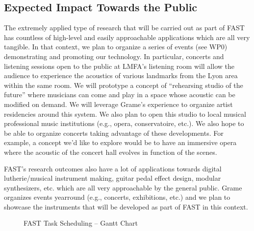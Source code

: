 \documentclass[a4paper,9pt]{extarticle}
\newcommand{\PP}{FAST}
\begin{document}
\subsection{Expected Impact Towards the Public}

The extremely applied type of research that will be carried out as part of \PP{} has countless of high-level and easily approachable applications which are all very tangible. In that context, we plan to organize a series of events (see WP0) demonstrating and promoting our technology. In particular, concerts and listening sessions open to the public at LMFA's listening room will allow the audience to experience the acoustics of various landmarks from the Lyon area within the same room. We will prototype a concept of ``rehearsing studio of the future'' where musicians can come and play in a space whose acoustic can be modified on demand. We will leverage Grame's experience to organize artist residencies around this system. We also plan to open this studio to local musical professional music institutions (e.g., opera, conservatoire, etc.). We also hope to be able to organize concerts taking advantage of these developments. For example, a concept we'd like to explore would be to have an immersive opera where the acoustic of the concert hall evolves in function of the scenes.

\PP{}'s research outcomes also have a lot of applications towards digital lutherie/musical instrument making, guitar pedal effect design, modular synthesizers, etc. which are all very approachable by the general public. Grame organizes events yearround (e.g., concerts, exhibitions, etc.) and we plan to showcase the instruments that will be developed as part of \PP{} in this context.


\begin{figure}
  
  \caption{\PP{} Task Scheduling -- Gantt Chart}
  \label{fig:gannt}
\end{figure}

{

  
  

}
\end{document}
